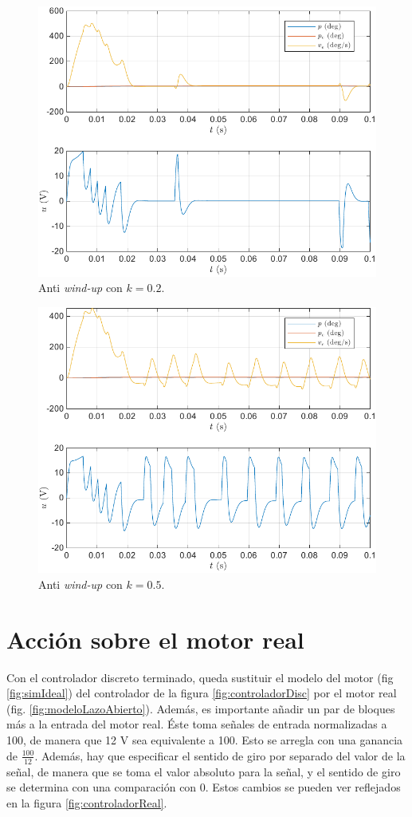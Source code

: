 \documentclass{article}
\begin{document}
\begin{figure}[H]
    \centering
    \includegraphics[width=0.75\linewidth]{img/antiWindUpMedio.pdf}
    \caption{Anti \textit{wind-up} con $k = 0.2$.}
    \label{fig:antiWindUpMedio}
\end{figure}

\begin{figure}[H]
    \centering
    \includegraphics[width=0.75\linewidth]{img/antiWindUpFuerte.pdf}
    \caption{Anti \textit{wind-up} con $k = 0.5$.}
    \label{fig:antiWindUpFuerte}
\end{figure}


\section{Acción sobre el motor real}

Con el controlador discreto terminado, queda sustituir el modelo del motor (fig \ref{fig:simIdeal}) del controlador de la figura \ref{fig:controladorDisc} por el motor real (fig. \ref{fig:modeloLazoAbierto}). Además, es importante añadir un par de bloques más a la entrada del motor real. Éste toma señales de entrada normalizadas a 100, de manera que 12 V sea equivalente a 100. Esto se arregla con una ganancia de $\frac{100}{12}$. Además, hay que especificar el sentido de giro por separado del valor de la señal, de manera que se toma el valor absoluto para la señal, y el sentido de giro se determina con una comparación con 0. Estos cambios se pueden ver reflejados en la figura \ref{fig:controladorReal}.
\end{document}

